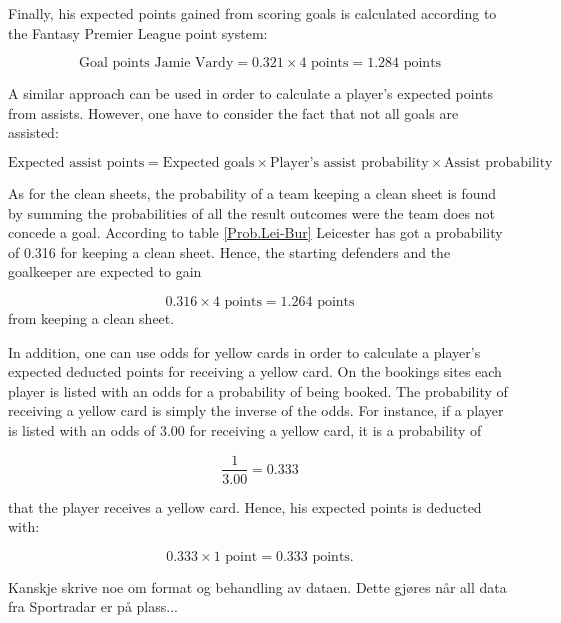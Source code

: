 Finally, his expected points gained from scoring goals is calculated according to the Fantasy Premier League point system: 

\begin{equation*}
    \textrm{Goal points Jamie Vardy} = 0.321 \times \textrm{4 points} = \textrm{1.284 points}
\end{equation*}

A similar approach can be used in order to calculate a player's expected points from assists. However, one have to consider the fact that not all goals are assisted: 

\begin{equation*}
    \textrm{Expected assist points} = \textrm{Expected goals} \times \textrm{Player's assist probability} \times \textrm{Assist probability}
\end{equation*}

As for the clean sheets, the probability of a team keeping a clean sheet is found by summing the probabilities of all the result outcomes were the team does not concede a goal. According to table \ref{Prob.Lei-Bur} Leicester has got a probability of 0.316 for keeping a clean sheet. Hence, the starting defenders and the  goalkeeper are expected to gain

\begin{equation*}
    0.316 \times \textrm{4 points} = \textrm{1.264 points}
\end{equation*}
from keeping a clean sheet. 

\newpar
In addition, one can use odds for yellow cards in order to calculate a player's expected deducted points for receiving a yellow card. On the bookings sites each player is listed with an odds for a probability of being booked. The probability of receiving a yellow card is simply the inverse of the odds. For instance, if a player is listed with an odds of 3.00 for receiving a yellow card, it is a probability of

\begin{equation*}
    \frac{1}{3.00} = 0.333 
\end{equation*}

that the player receives a yellow card. Hence, his expected points is deducted with:

\begin{equation*}
    0.333 \times \textrm{1 point} = \textrm{0.333 points.} 
\end{equation*}

\newpar
Kanskje skrive noe om format og behandling av dataen. Dette gjøres når all data fra Sportradar er på plass...

